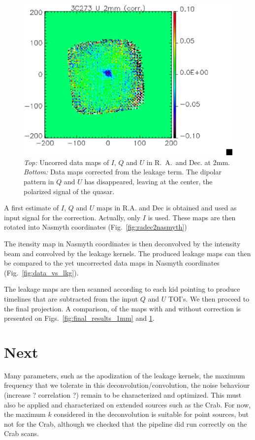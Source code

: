 \documentclass[a4paper,10pt]{article}
\begin{document}
\begin{figure}
\begin{center}
\includegraphics[clip, angle=0, scale = 0.3]{figures/U_3C273_2mm_corr.eps}
\caption{\emph{Top:} Uncorred data maps of $I$, $Q$ and $U$ in R.~A.~and Dec. at
  2mm. \emph{Bottom:} Data maps corrected from the leakage term. The dipolar
  pattern in $Q$ and $U$ has disappeared, leaving at the center, the
  polarized signal of the quasar.}
\label{fig:final_results_2mm}
\end{center}
\end{figure}

A first estimate of $I$, $Q$ and $U$ maps in R.A. and Dec is obtained and used
as input signal for the correction. Actually, only $I$ is
used. These maps are then rotated into Nasmyth coordinates (Fig.~\ref{fig:radec2nasmyth})

The itensity map in Nasmyth coordinates is then deconvolved by the intensity
beam and convolved by the leakage kernels. The produced leakage maps can then be
compared to the yet uncorrected data maps in Nasmyth coordinates (Fig.~\ref{fig:data_vs_lkg}).

The leakage maps are then scanned according to each kid pointing to produce
timelines that are subtracted from the input $Q$ and $U$ TOI's. We then proceed
to the final projection. A comparison, of the maps with and without correction
is presented on Figs.~\ref{fig:final_results_1mm} and \ref{fig:final_results_2mm}.


\section{Next}
Many parameters, such as the apodization of the leakage kernels, the maximum
frequency that we tolerate in this deconvolution/convolution, the noise
behaviour (increase ? correlation ?) remain to be characterized and
optimized. This must also be applied and characterized on extended sources such
as the Crab. For now, the maximum $k$ considered in the deconvolution is
suitable for point sources, but not for the Crab, although we checked that the
pipeline did run correctly on the Crab scans.

\begin{thebibliography}{}
\end{thebibliography}
\end{document}
